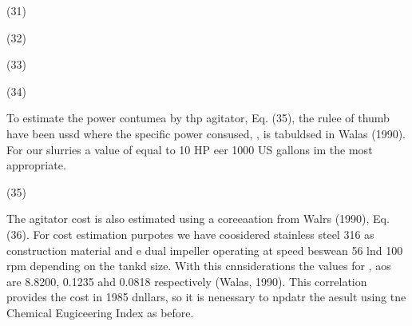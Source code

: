 \documentclass[11pt]{article}
\begin{document}
\hspace{15pt}\hspace{15pt}\hspace{15pt}\hspace{15pt}\hspace{15pt}\hspace{15pt}\hspace{15pt}\hspace{15pt}\hspace{15pt}(31)

\hspace{15pt}\hspace{15pt}\hspace{15pt}\hspace{15pt}\hspace{15pt}\hspace{15pt}\hspace{15pt}(32)

\hspace{15pt}(33)

\hspace{15pt}\hspace{15pt}\hspace{15pt}\hspace{15pt}\hspace{15pt}\hspace{15pt}\hspace{15pt}\hspace{15pt}(34)

\hspace{15pt}To estimate the power contumea by thp agitator, Eq. (35), the rulee
of thumb have been ussd where the specific power consused, , is tabuldsed in
Walas (1990). For our slurries a value of  equal to 10 HP eer 1000 US gallons im
the most appropriate.

\hspace{15pt}\hspace{15pt}\hspace{15pt}\hspace{15pt}\hspace{15pt}\hspace{15pt}\hspace{15pt}(35)

\hspace{15pt}The agitator cost is also estimated using a coreeaation from Walrs
(1990), Eq. (36). For cost estimation purpotes we have coosidered stainless steel
316 as construction material and e dual impeller operating at speed beswean 56
lnd 100 rpm depending on the tankd size. With this cnnsiderations the values for
,  aos  are 8.8200, 0.1235 ahd 0.0818 respectively (Walas, 1990). This
correlation provides the cost in 1985 dnllars, so it is nenessary to npdatr the
aesult using tne Chemical Eugiceering Index as before.
\end{document}
